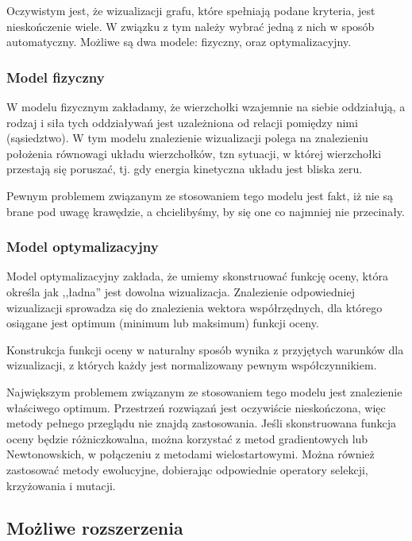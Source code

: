\documentclass[a4paper,onecolumn,oneside,12pt]{mwart}
\begin{document}
Oczywistym jest, że wizualizacji grafu, które spełniają podane kryteria,
jest nieskończenie wiele. W związku z tym należy wybrać jedną z nich w
sposób automatyczny. Możliwe są dwa modele: fizyczny, oraz optymalizacyjny.

\subsubsection{Model fizyczny}
\label{model:physics}

W modelu fizycznym zakładamy, że wierzchołki wzajemnie na siebie
oddziałują, a rodzaj i siła tych oddziaływań jest uzależniona od relacji
pomiędzy nimi (sąsiedztwo). W tym modelu znalezienie wizualizacji polega na
znalezieniu położenia równowagi układu wierzchołków, tzn sytuacji, w której
wierzchołki przestają się poruszać, tj. gdy energia kinetyczna układu jest
bliska zeru.

Pewnym problemem związanym ze stosowaniem tego modelu jest fakt, iż nie są
brane pod uwagę krawędzie, a chcielibyśmy, by się one co najmniej nie
przecinały.

\subsubsection{Model optymalizacyjny}
\label{model:optimize}

Model optymalizacyjny zakłada, że umiemy skonstruować funkcję oceny, która
określa jak ,,ładna'' jest dowolna wizualizacja. Znalezienie odpowiedniej wizualizacji sprowadza się do znalezienia wektora współrzędnych, dla którego osiągane jest
optimum (minimum lub maksimum) funkcji oceny.

Konstrukcja funkcji oceny w naturalny sposób wynika z przyjętych warunków
dla wizualizacji, z których każdy jest normalizowany pewnym współczynnikiem.

Największym problemem związanym ze stosowaniem tego modelu jest znalezienie
właściwego optimum. Przestrzeń rozwiązań jest oczywiście nieskończona, więc metody pełnego przeglądu nie znajdą zastosowania. Jeśli skonstruowana funkcja oceny
będzie różniczkowalna, można korzystać z metod gradientowych lub Newtonowskich,
w połączeniu z metodami wielostartowymi. Można również zastosować metody ewolucyjne, dobierając odpowiednie operatory selekcji, krzyżowania i mutacji.

\subsection{Możliwe rozszerzenia}
\end{document}
